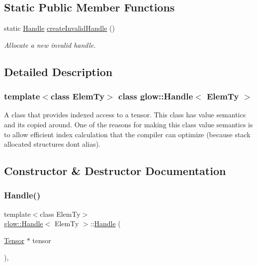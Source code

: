 \subsection*{Static Public Member Functions}
\begin{DoxyCompactItemize}
\item 
\mbox{\label{classglow_1_1_handle_a0a6464ed0e2ca10bb7847227586f36f2}} 
static \hyperlink{classglow_1_1_handle}{Handle} \hyperlink{classglow_1_1_handle_a0a6464ed0e2ca10bb7847227586f36f2}{create\+Invalid\+Handle} ()
\begin{DoxyCompactList}\small\item\em Allocate a new invalid handle. \end{DoxyCompactList}\end{DoxyCompactItemize}


\subsection{Detailed Description}
\subsubsection*{template$<$class Elem\+Ty$>$\newline
class glow\+::\+Handle$<$ Elem\+Ty $>$}

A class that provides indexed access to a tensor. This class has value semantics and it\textquotesingle{}s copied around. One of the reasons for making this class value semantics is to allow efficient index calculation that the compiler can optimize (because stack allocated structures don\textquotesingle{}t alias). 

\subsection{Constructor \& Destructor Documentation}
\mbox{\label{classglow_1_1_handle_a9c2df11f63a6d74d56f9630ab0d5b213}} 
\subsubsection{\texorpdfstring{Handle()}{Handle()}}
{\footnotesize\ttfamily template$<$class Elem\+Ty$>$ \\
\hyperlink{classglow_1_1_handle}{glow\+::\+Handle}$<$ Elem\+Ty $>$\+::\hyperlink{classglow_1_1_handle}{Handle} (\begin{DoxyParamCaption}\item[{\hyperlink{classglow_1_1_tensor}{Tensor} $\ast$}]{tensor }\end{DoxyParamCaption})\hspace{0.3cm}{\ttfamily [inline]}, {\ttfamily [explicit]}}



